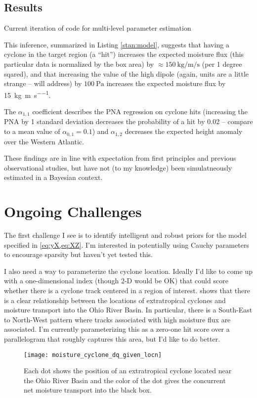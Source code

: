 \documentclass[12pt]{article}
\begin{document}
\subsection{Results}

\begin{lstfloat}
    
    \caption{Current iteration of \stan code for multi-level parameter estimation \label{stan:model}}
\end{lstfloat}

This inference, summarized in Listing \ref{stan:model}, suggests that having a cyclone in the target region (a ``hit'') increases the expected moisture flux (this particular data is normalized by the box area) by $\approx \SI{150}{\kilogram\per\meter \per \second}$ (per 1 degree sqared), and that increasing the value of the high dipole (again, units are a little strange -- will address) by $\SI{100}{\pascal}$ increases the expected moisture flux by \SI{15}{\kilogram\per\meter\per\second}.

The $\alpha_{1,1}$ coefficient describes the PNA regression on cyclone hits (increasing the PNA by 1 standard deviation decreases the probability of a hit by 0.02 -- compare to a mean value of $\alpha_{0,1} = 0.1$) and $\alpha_{1,2}$ decreases the expected height anomaly over the Western Atlantic.

These findings are in line with expectation from first principles and previous observational studies, but have not (to my knowledge) been simulatneously estimated in a Bayesian context.



\section{Ongoing Challenges} \label{sec:challenges}

The first challenge I see is to identify intelligent and robust priors for the model specified in \cref{eq:yX,eq:XZ}.
I'm interested in potentially using Cauchy parameters to encourage sparsity but haven't yet tested this.

I also need a way to parameterize the cyclone location.
Ideally I'd like to come up with a one-dimensional index (though 2-D would be OK) that could score whether there is a cyclone track centered in a region of interest.
 shows that there is a clear relationship between the locations of extratropical cyclones and moisture transport into the Ohio River Basin.
In particular, there is a South-East to North-West pattern where tracks associated with high moisture flux are associated.
I'm currently parameterizing this as a zero-one hit score over a parallelogram that roughly captures this area, but I'd like to do better.
\begin{figure}[h]
    \centering
    \texttt{[image: moisture\_cyclone\_dq\_given\_locn]}
    \caption{Each dot shows the position of an extratropical cyclone \citep[see][]{Booth2015} located near the Ohio River Basin and the color of the dot gives the concurrent net moisture transport into the black box.}
    \label{fig:cyclone-center-moisture}
\end{figure}
\end{document}
